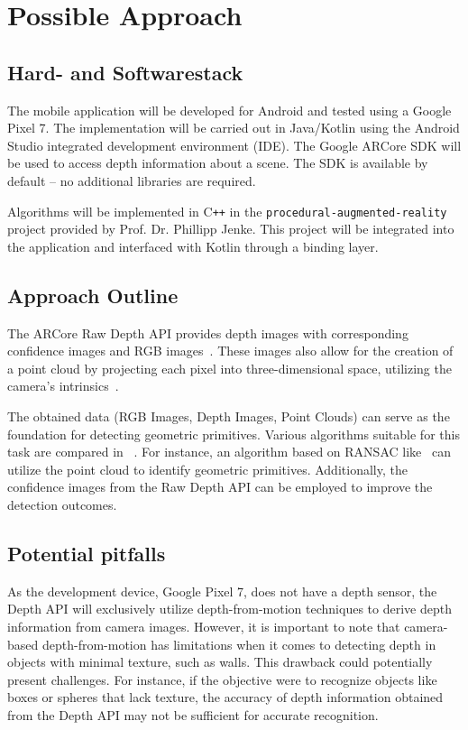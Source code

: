 \chapter*{Possible Approach}


\section*{Hard- and Softwarestack}

The mobile application will be developed for Android and tested using a Google Pixel 7.
The implementation will be carried out in Java/Kotlin using the Android Studio integrated development environment (IDE).
The Google ARCore SDK will be used to access depth information about a scene.
The SDK is available by default -- no additional libraries are required.

Algorithms will be implemented in C\texttt{++} in the \texttt{procedural-augmented-reality} project provided by Prof. Dr. Phillipp Jenke.
This project will be integrated into the application and interfaced with Kotlin through a binding layer.


\section*{Approach Outline}
The ARCore Raw Depth API provides depth images with corresponding confidence images and RGB images~\parencite{google_llc_arcore_doc}.
These images also allow for the creation of a point cloud by projecting each pixel into three-dimensional space, utilizing the camera's intrinsics~\parencite{google_llc_codelab_raw_depth}.

The obtained data (RGB Images, Depth Images, Point Clouds) can serve as the foundation for detecting geometric primitives.
Various algorithms suitable for this task are compared in ~\parencite{kaiser_survey_2019}.
For instance, an algorithm based on RANSAC like~\parencite{schnabel_efficient_2007}
can utilize the point cloud to identify geometric primitives.
Additionally, the confidence images from the Raw Depth API can be employed to improve the detection outcomes.

\section*{Potential pitfalls}
As the development device, Google Pixel 7, does not have a depth sensor,
the Depth API will exclusively utilize depth-from-motion techniques to derive depth information from camera images.
However, it is important to note that camera-based depth-from-motion has limitations
when it comes to detecting depth in objects with minimal texture, such as walls.
This drawback could potentially present challenges.
For instance, if the objective were to recognize objects like boxes or spheres that lack texture,
the accuracy of depth information obtained from the Depth API may not be sufficient for accurate recognition.
\parencite{google_llc_arcore_doc}

